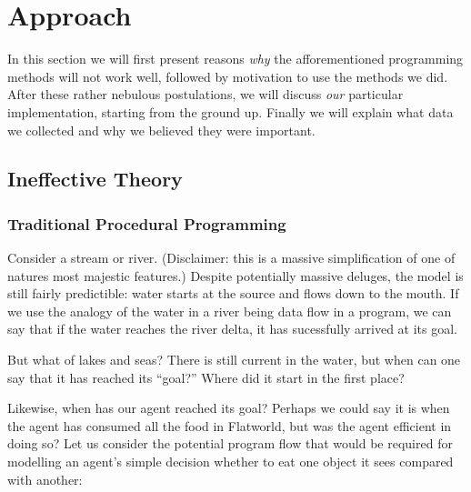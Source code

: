 \section{Approach} \label{sec:Approach}

In this section we will first present reasons \emph{why} the afforementioned
programming methods will not work well, followed by motivation to use the
methods we did. After these rather nebulous postulations, we will discuss
\emph{our} particular implementation, starting from the ground up. Finally
we will explain what data we collected and why we believed they were important.

\subsection{Ineffective Theory}

\subsubsection{Traditional Procedural Programming}
Consider a stream or river. (Disclaimer: this is a massive simplification of
one of natures most majestic features.) Despite potentially massive deluges, 
the model is still fairly predictible: water starts at the source and flows 
down to the mouth. If we use the analogy of the water in a river being data 
flow in a program, we can say that if the water reaches the river delta, it
has sucessfully arrived at its goal.

But what of lakes and seas? There is still current in the water, but when
can one say that it has reached its ``goal?'' Where did it start in the first
place?

Likewise, when has our agent reached its goal? Perhaps we could say it is 
when the agent has consumed all the food in Flatworld, but was the agent 
efficient in doing so? Let us consider the potential program flow that
would be required for modelling an agent's simple decision whether to eat one
object it sees compared with another:

